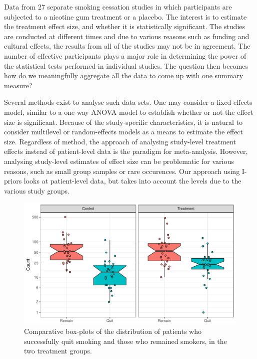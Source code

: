 \documentclass[a4paper,showframe,11pt]{report}\usepackage[]{graphicx}\usepackage[]{color}
\makeatletter
\def\maxwidth{ %
  \ifdim\Gin@nat@width>\linewidth
    \linewidth
  \else
    \Gin@nat@width
  \fi
}
\newenvironment{knitrout}{}{} %
\makeatother
\begin{document}
Data from 27 separate smoking cessation studies in which participants are subjected to a nicotine gum treatment or a placebo.
The interest is to estimate the treatment effect size, and whether it is statistically significant.
The studies are conducted at different times and due to various reasons such as funding and cultural effects, the results from all of the studies may not be in agreement.
The number of effective participants plays a major role in determining the power of the statistical tests performed in individual studies.
The question then becomes how do we meaningfully aggregate all the data to come up with one summary measure?

Several methods exist to analyse such data sets.
One may consider a fixed-effects model, similar to a one-way ANOVA model to establish whether or not the effect size is significant.
Because of the study-specific characteristics, it is natural to consider multilevel or random-effects models as a means to estimate the effect size.
Regardless of method, the approach of analysing study-level treatment effects instead of patient-level data is the paradigm for meta-analysis.
However, analysing study-level estimates of effect size can be problematic for various reasons, such as small group samples or rare occurences.
Our approach using I-priors looks at patient-level data, but takes into account the levels due to the various study groups.

\begin{knitrout}
\color{fgcolor}\begin{figure}

{\centering \includegraphics[width=\maxwidth]{figure/plot_data_smoke-1} 

}

\caption[Comparative box-plots of the distribution of patients who successfully quit smoking and those who remained smokers, in the two treatment groups]{Comparative box-plots of the distribution of patients who successfully quit smoking and those who remained smokers, in the two treatment groups.}\label{fig:plot.data.smoke}
\end{figure}


\end{knitrout}
\end{document}
